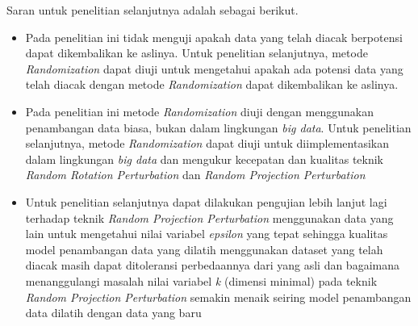 Saran untuk penelitian selanjutnya adalah sebagai berikut.
\begin{itemize}
    \item Pada penelitian ini tidak menguji apakah data yang telah diacak berpotensi dapat dikembalikan ke aslinya. Untuk penelitian selanjutnya, metode \textit{Randomization} dapat diuji untuk mengetahui apakah ada potensi data yang telah diacak dengan metode \textit{Randomization} dapat dikembalikan ke aslinya.
    \item Pada penelitian ini metode \textit{Randomization} diuji dengan menggunakan penambangan data biasa, bukan dalam lingkungan \textit{big data}. Untuk penelitian selanjutnya, metode \textit{Randomization} dapat diuji untuk diimplementasikan dalam lingkungan \textit{big data} dan mengukur kecepatan dan kualitas teknik \textit{Random Rotation Perturbation} dan \textit{Random Projection Perturbation}
    \item Untuk penelitian selanjutnya dapat dilakukan pengujian lebih lanjut lagi terhadap teknik \textit{Random Projection Perturbation} menggunakan data yang lain untuk mengetahui nilai variabel \textit{epsilon} yang tepat sehingga kualitas model penambangan data yang dilatih menggunakan dataset yang telah diacak masih dapat ditoleransi perbedaannya dari yang asli dan bagaimana menanggulangi masalah nilai variabel \textit{k} (dimensi minimal) pada teknik \textit{Random Projection Perturbation} semakin menaik seiring model penambangan data dilatih dengan data yang baru
\end{itemize}
